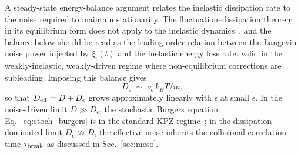 \documentclass[aps,pre,twocolumn,superscriptaddress,longbibliography,floatfix]{revtex4-2}
\begin{document}
A steady-state energy-balance argument relates the
inelastic dissipation rate to the noise required to
maintain stationarity. The fluctuation--dissipation
theorem in its equilibrium form does not apply to the
inelastic dynamics~\cite{BrilliantovPoschel}, and the
balance below should be read as the leading-order
relation between the Langevin noise power injected by
$\xi_i(t)$ and the inelastic energy loss rate, valid in
the weakly-inelastic, weakly-driven regime where
non-equilibrium corrections are subleading. Imposing this
balance gives
\begin{equation}
D_\epsilon \;\sim\; \nu_\epsilon\,k_BT/\bar m,
\end{equation}
so that $D_{\rm eff} = D + D_\epsilon$ grows approximately
linearly with $\epsilon$ at small $\epsilon$. In the
noise-driven limit $D\gg D_\epsilon$, the stochastic
Burgers equation Eq.~\eqref{eq:stoch_burgers} is in the
standard KPZ regime~\cite{KPZ1986}; in the
dissipation-dominated limit $D_\epsilon\gg D$, the
effective noise inherits the collisional correlation time
$\tau_{\rm break}$ as discussed in
Sec.~\ref{sec:meso}.
\end{document}
